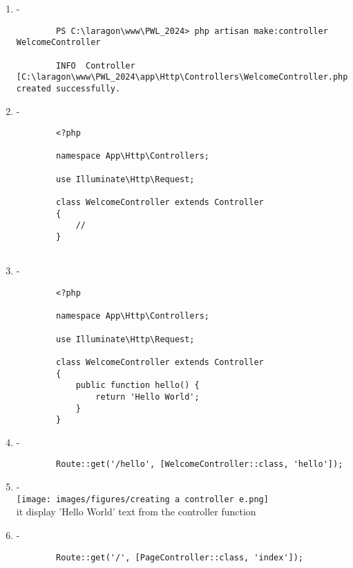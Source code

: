 \documentclass[12pt,titlepage]{article}
\begin{document}
\begin{enumerate}[label=\alph*.]
    \item -
    \begin{verbatim}
        PS C:\laragon\www\PWL_2024> php artisan make:controller WelcomeController

        INFO  Controller [C:\laragon\www\PWL_2024\app\Http\Controllers\WelcomeController.php] created successfully.
    \end{verbatim}
    \item -
    \begin{verbatim}
        <?php

        namespace App\Http\Controllers;
        
        use Illuminate\Http\Request;
        
        class WelcomeController extends Controller
        {
            //
        }
        
    \end{verbatim}

    \newpage
    
    \item -
    \begin{verbatim}
        <?php

        namespace App\Http\Controllers;
        
        use Illuminate\Http\Request;
        
        class WelcomeController extends Controller
        {
            public function hello() {
                return 'Hello World';
            }
        }

    \end{verbatim}
    \item -
    \begin{verbatim}
        Route::get('/hello', [WelcomeController::class, 'hello']);
    \end{verbatim}
    \item - \\ \texttt{[image: images/figures/creating a controller e.png]} \\ it display 'Hello World' text from the controller function

    \newpage

    \item -
    \begin{verbatim}
        Route::get('/', [PageController::class, 'index']);


\end{verbatim}
\end{enumerate}
\end{document}
